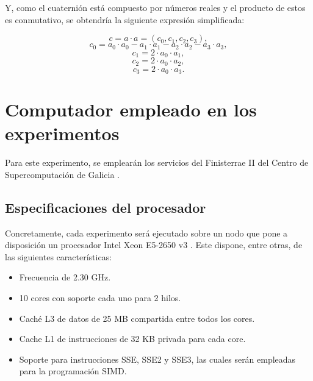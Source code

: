\documentclass[conference]{IEEEtran}
\begin{document}
Y, como el cuaternión está compuesto por números reales y el producto de estos es conmutativo, se obtendría la siguiente expresión simplificada:

\begin{equation}
    \label{productoCuatIguales2}
    c = a\cdot a = (c_{0}, c_{1}, c_{2}, c_{3}),
\end{equation}
\begin{equation*}
    c_{0} = a_{0} \cdot a_{0} - a_{1} \cdot a_{1} - a_{2} \cdot a_{2} - a_{3} \cdot a_{3},
\end{equation*}
\begin{equation*}
    c_{1} = 2 \cdot a_{0} \cdot a_{1},
\end{equation*}
\begin{equation*}
    c_{2} = 2 \cdot a_{0} \cdot a_{2},
\end{equation*}
\begin{equation*}
    c_{3} = 2 \cdot a_{0} \cdot a_{3}.
\end{equation*}

\section{Computador empleado en los experimentos} \label{descripcionComputador}

Para este experimento, se emplearán los servicios del Finisterrae II del Centro de Supercomputación de Galicia \cite{cesga}.

\subsection{Especificaciones del procesador}

Concretamente, cada experimento será ejecutado sobre un nodo que pone a disposición un procesador Intel Xeon E5-2650 v3 \cite{procesador}. Este dispone, entre otras, de las siguientes características:
\begin{itemize}
    \item Frecuencia de 2.30 GHz.
    \item 10 cores con soporte cada uno para 2 hilos.
    \item Caché L3 de datos de 25 MB compartida entre todos los cores.
    \item Cache L1 de instrucciones de 32 KB privada para cada core.
    \item Soporte para instrucciones SSE, SSE2 y SSE3, las cuales serán empleadas para la programación SIMD.
\end{itemize}
\end{document}
